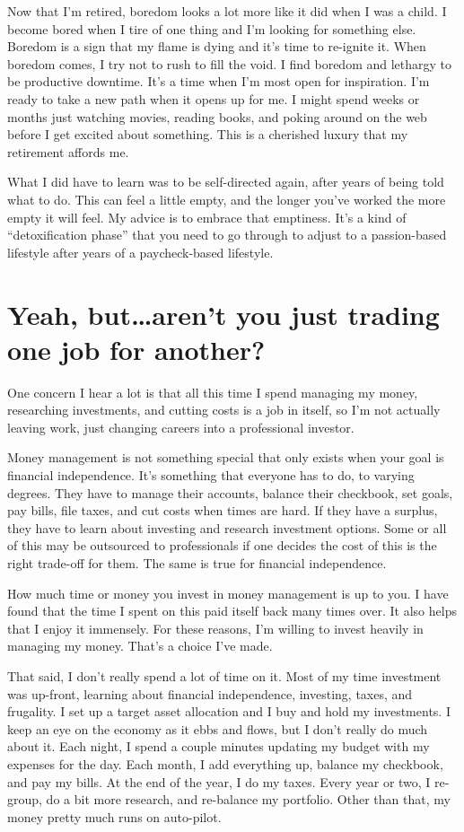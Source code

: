 Now that I'm retired, boredom looks a lot more like it did when I was a child. I become bored when I tire of one thing and I'm looking for something else. Boredom is a sign that my flame is dying and it's time to re-ignite it. When boredom comes, I try not to rush to fill the void. I find boredom and lethargy to be productive downtime. It's a time when I'm most open for inspiration. I'm ready to take a new path when it opens up for me. I might spend weeks or months just watching movies, reading books, and poking around on the web before I get excited about something. This is a cherished luxury that my retirement affords me.

What I did have to learn was to be self-directed again, after years of being told what to do. This can feel a little empty, and the longer you've worked the more empty it will feel. My advice is to embrace that emptiness. It's a kind of ``detoxification phase'' that you need to go through to adjust to a passion-based lifestyle after years of a paycheck-based lifestyle.

\section{Yeah, but\ldots aren't you just trading one job for another?}
One concern I hear a lot is that all this time I spend managing my money, researching investments, and cutting costs is a job in itself, so I'm not actually leaving work, just changing careers into a professional investor.

Money management is not something special that only exists when your goal is financial independence. It's something that everyone has to do, to varying degrees. They have to manage their accounts, balance their checkbook, set goals, pay bills, file taxes, and cut costs when times are hard. If they have a surplus, they have to learn about investing and research investment options. Some or all of this may be outsourced to professionals if one decides the cost of this is the right trade-off for them. The same is true for financial independence.

How much time or money you invest in money management is up to you. I have found that the time I spent on this paid itself back many times over. It also helps that I enjoy it immensely. For these reasons, I'm willing to invest heavily in managing my money. That's a choice I've made.

That said, I don't really spend a lot of time on it. Most of my time investment was up-front, learning about financial independence, investing, taxes, and frugality. I set up a target asset allocation and I buy and hold my investments. I keep an eye on the economy as it ebbs and flows, but I don't really do much about it. Each night, I spend a couple minutes updating my budget with my expenses for the day. Each month, I add everything up, balance my checkbook, and pay my bills. At the end of the year, I do my taxes. Every year or two, I re-group, do a bit more research, and re-balance my portfolio. Other than that, my money pretty much runs on auto-pilot.

